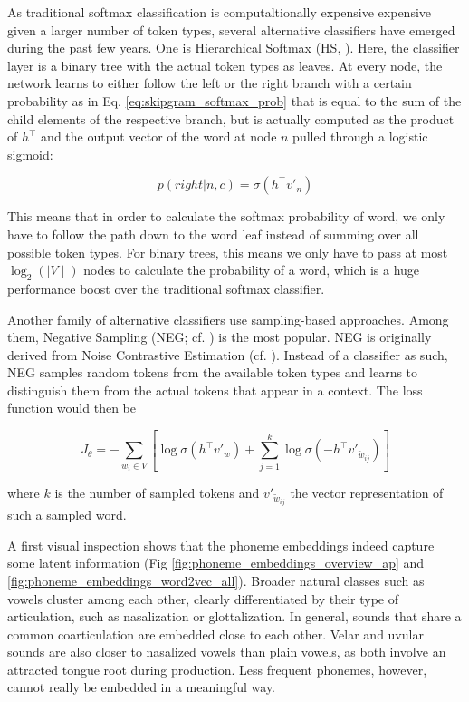 \documentclass[6pt]{article}
\begin{document}
As traditional softmax classification is computaltionally expensive expensive given a larger number of token types, several alternative classifiers have emerged during the past few years. One is Hierarchical Softmax (HS, \cite{morin2005hierarchical}). Here, the classifier layer is a binary tree with the actual token types as leaves. At every node, the network learns to either follow the left or the right branch with a certain probability as in Eq. \ref{eq:skipgram_softmax_prob} that is equal to the sum of the child elements of the respective  branch, but is actually computed as the product of $h^\top$ and the output vector of the word at node $n$ pulled through a logistic sigmoid:

\begin{equation}
p(right|n,c) = \sigma(h^\top v'_n) 
\label{eq:hierarchicalsoftmax_nodeprob}
\end{equation}

This means that in order to calculate the softmax probability of word, we only have to follow the path down to the word leaf instead of summing over all possible token types. For binary trees, this means we only have to pass at most $\log_2(\mid V\mid)$ nodes to calculate the probability of a word, which is a huge performance boost over the traditional softmax classifier. 

Another family of alternative classifiers use sampling-based approaches. Among them, Negative Sampling (NEG; cf. \cite{goldberg2014word2vec}) is the most popular. NEG is originally derived from Noise Contrastive Estimation (cf. \cite{gutmann2010noise,mnih2012fast}). Instead of a classifier as such, NEG samples random tokens from the available token types and learns to distinguish them from the actual tokens that appear in a context. The loss function would then be

\begin{equation}
J_{\theta}  = - \sum_{w_i \in V} [\log \sigma(h^{\top}v'_w)
+ \sum_{j=1}^{k}\log \sigma(-h^{\top}v'_{\tilde{w}_{ij}})]
\label{eq:neg_sampling_3}
\end{equation}

where $k$ is the number of sampled tokens and $v'_{\tilde{w}_{ij}}$ the vector representation of such a sampled word.

A first visual inspection shows that the phoneme embeddings indeed capture some latent information (Fig \ref{fig:phoneme_embeddings_overview_ap} and \ref{fig:phoneme_embeddings_word2vec_all}). Broader natural classes such as vowels cluster among each other,  clearly differentiated by their type of articulation, such as nasalization or glottalization. In general, sounds that share a common coarticulation are embedded close to each other. Velar and uvular sounds are also closer to nasalized vowels than plain vowels, as both involve an attracted tongue root during production. Less frequent phonemes, however, cannot really be embedded in a meaningful way.
\end{document}
